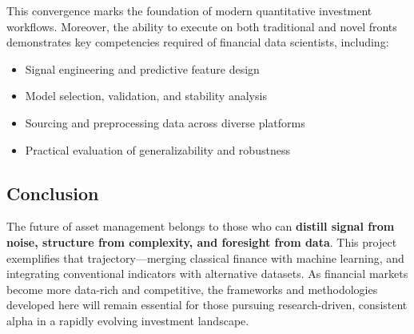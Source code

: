 This convergence marks the foundation of modern quantitative investment workflows. Moreover, the ability to execute on both traditional and novel fronts demonstrates key competencies required of financial data scientists, including:

\begin{itemize}
    \item Signal engineering and predictive feature design
    \item Model selection, validation, and stability analysis
    \item Sourcing and preprocessing data across diverse platforms
    \item Practical evaluation of generalizability and robustness
\end{itemize}

\subsection{Conclusion}

The future of asset management belongs to those who can \textbf{distill signal from noise, structure from complexity, and foresight from data}. This project exemplifies that trajectory—merging classical finance with machine learning, and integrating conventional indicators with alternative datasets. As financial markets become more data-rich and competitive, the frameworks and methodologies developed here will remain essential for those pursuing research-driven, consistent alpha in a rapidly evolving investment landscape.
